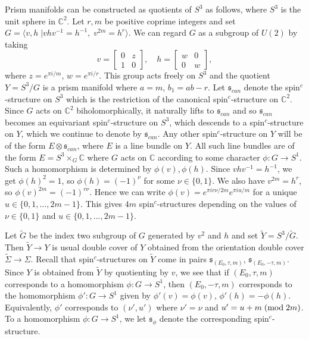 \documentclass{amsart}
\theoremstyle{definition}
\theoremstyle{remark}
\numberwithin{equation}{section}
\begin{document}
Prism manifolds can be constructed as quotients of $S^3$ as follows, where $S^3$ is the unit sphere in $\mathbb{C}^2$. Let $r,m$ be positive coprime integers and set $G = \langle v , h \; | vhv^{-1} = h^{-1}, \; v^{2m} = h^r \rangle$. We can regard $G$ as a subgroup of $U(2)$ by taking 
\[
v = \left[ \begin{matrix} 0 & z \\ 1 & 0 \end{matrix} \right], \quad h = \left[ \begin{matrix} w & 0 \\ 0 & w \end{matrix} \right],
\]
where $z = e^{\pi i/m}$, $w = e^{\pi i/r}$. This group acts freely on $S^3$ and the quotient $Y = S^3/G$ is a prism manifold where $a = m$, $b_1 = ab - r$. Let $\mathfrak{s}_{can}$ denote the spin$^c$-structure on $S^3$ which is the restriction of the canonical spin$^c$-structure on $\mathbb{C}^2$. Since $G$ acts on $\mathbb{C}^2$ biholomorphically, it naturally lifts to $\mathfrak{s}_{can}$ and so $\mathfrak{s}_{can}$ becomes an equivariant spin$^c$-structure on $S^3$, which descends to a spin$^c$-structure on $Y$, which we continue to denote by $\mathfrak{s}_{can}$. Any other spin$^c$-structure on $Y$ will be of the form $E \otimes \mathfrak{s}_{can}$, where $E$ is a line bundle on $Y$. All such line bundles are of the form $E = S^3 \times_G \mathbb{C}$ where $G$ acts on $\mathbb{C}$ according to some character $\phi : G \to S^1$. Such a homomorphism is determined by $\phi(v),\phi(h)$. Since $vhv^{-1} = h^{-1}$, we get $\phi(h)^2 = 1$, so $\phi(h) = (-1)^{\nu}$ for some $\nu \in \{0,1\}$. We also have $v^{2m} = h^r$, so $\phi(v)^{2m} = (-1)^{r \nu}$. Hence we can write $\phi(v) = e^{\pi i r\nu/2m} e^{\pi i u/m}$ for a unique $u \in \{ 0 , 1 , \dots , 2m-1\}$. This gives $4m$ spin$^c$-structures depending on the values of $\nu \in \{ 0,1\}$ and $u \in \{0,1, \dots , 2m-1\}$.

Let $\widetilde{G}$ be the index two subgroup of $G$ generated by $v^2$ and $h$ and set $\widetilde{Y} = S^3/\widetilde{G}$. Then $\widetilde{Y} \to Y$ is usual double cover of $Y$ obtained from the orientation double cover $\widetilde{\Sigma} \to \Sigma$. Recall that spin$^c$-structures on $\widetilde{Y}$ come in pairs $\mathfrak{s}_{(E_0 , \tau,m)}$, $\mathfrak{s}_{(E_0 , -\tau,m)}$. Since $Y$ is obtained from $\widetilde{Y}$ by quotienting by $v$, we see that if $(E_0 , \tau, m)$ corresponds to a homomorphism $\phi : G \to S^1$, then $(E_0 , -\tau , m)$ corresponds to the homomorphism $\phi' : G \to S^1$ given by $\phi'(v) = \phi(v)$, $\phi'(h) = -\phi(h)$. Equivalently, $\phi'$ corresponds to $(\nu' ,u')$ where $\nu' = \nu$ and $u' = u + m \; ({\rm mod} \; 2m)$. To a homomorphism $\phi : G \to S^1$, we let $\mathfrak{s}_\phi$ denote the corresponding spin$^c$-structure.
\end{document}

